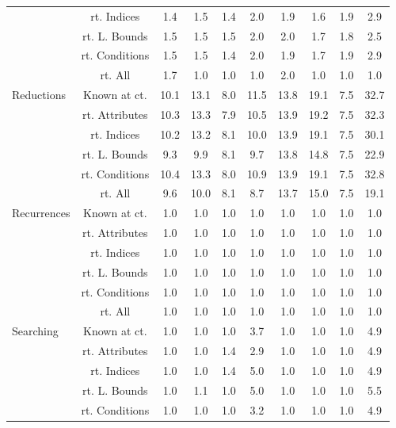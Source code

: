\documentclass{article}
\begin{document}
\begin{longtable}{|p{2cm}|c|c|c|c|c|c|c|c|c|}
 & rt. Indices & 1.4 & 1.5 & 1.4 & 2.0 & 1.9 & 1.6 & 1.9 & 2.9\\ \cline{2-10}
 & rt. L. Bounds & 1.5 & 1.5 & 1.5 & 2.0 & 2.0 & 1.7 & 1.8 & 2.5\\ \cline{2-10}
 & rt. Conditions & 1.5 & 1.5 & 1.4 & 2.0 & 1.9 & 1.7 & 1.9 & 2.9\\ \cline{2-10}
 & rt. All & 1.7 & 1.0 & 1.0 & 1.0 & 2.0 & 1.0 & 1.0 & 1.0\\ \cline{2-10}
\hline
\multirow{6}{*}{ \parbox{2cm}{Reductions}} & Known at ct. & 10.1 & 13.1 & 8.0 & 11.5 & 13.8 & 19.1 & 7.5 & 32.7\\ \cline{2-10}
 & rt. Attributes & 10.3 & 13.3 & 7.9 & 10.5 & 13.9 & 19.2 & 7.5 & 32.3\\ \cline{2-10}
 & rt. Indices & 10.2 & 13.2 & 8.1 & 10.0 & 13.9 & 19.1 & 7.5 & 30.1\\ \cline{2-10}
 & rt. L. Bounds & 9.3 & 9.9 & 8.1 & 9.7 & 13.8 & 14.8 & 7.5 & 22.9\\ \cline{2-10}
 & rt. Conditions & 10.4 & 13.3 & 8.0 & 10.9 & 13.9 & 19.1 & 7.5 & 32.8\\ \cline{2-10}
 & rt. All & 9.6 & 10.0 & 8.1 & 8.7 & 13.7 & 15.0 & 7.5 & 19.1\\ \cline{2-10}
\hline
\multirow{6}{*}{ \parbox{2cm}{Recurrences}} & Known at ct. & 1.0 & 1.0 & 1.0 & 1.0 & 1.0 & 1.0 & 1.0 & 1.0\\ \cline{2-10}
 & rt. Attributes & 1.0 & 1.0 & 1.0 & 1.0 & 1.0 & 1.0 & 1.0 & 1.0\\ \cline{2-10}
 & rt. Indices & 1.0 & 1.0 & 1.0 & 1.0 & 1.0 & 1.0 & 1.0 & 1.0\\ \cline{2-10}
 & rt. L. Bounds & 1.0 & 1.0 & 1.0 & 1.0 & 1.0 & 1.0 & 1.0 & 1.0\\ \cline{2-10}
 & rt. Conditions & 1.0 & 1.0 & 1.0 & 1.0 & 1.0 & 1.0 & 1.0 & 1.0\\ \cline{2-10}
 & rt. All & 1.0 & 1.0 & 1.0 & 1.0 & 1.0 & 1.0 & 1.0 & 1.0\\ \cline{2-10}
\hline
\multirow{6}{*}{ \parbox{2cm}{Searching}} & Known at ct. & 1.0 & 1.0 & 1.0 & 3.7 & 1.0 & 1.0 & 1.0 & 4.9\\ \cline{2-10}
 & rt. Attributes & 1.0 & 1.0 & 1.4 & 2.9 & 1.0 & 1.0 & 1.0 & 4.9\\ \cline{2-10}
 & rt. Indices & 1.0 & 1.0 & 1.4 & 5.0 & 1.0 & 1.0 & 1.0 & 4.9\\ \cline{2-10}
 & rt. L. Bounds & 1.0 & 1.1 & 1.0 & 5.0 & 1.0 & 1.0 & 1.0 & 5.5\\ \cline{2-10}
 & rt. Conditions & 1.0 & 1.0 & 1.0 & 3.2 & 1.0 & 1.0 & 1.0 & 4.9\\ \cline{2-10}

\end{longtable}
\end{document}
